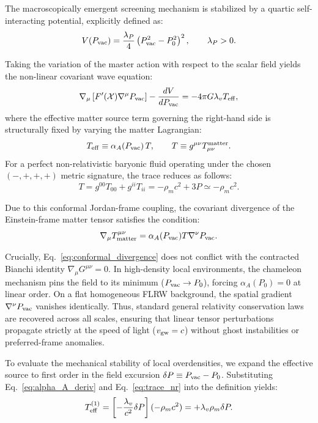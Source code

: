 \documentclass[prd,
               reprint,
               aps,
               preprintnumbers,
               nofootinbib,
               longbibliography,
               floatfix]{revtex4-2}
\begin{document}
The macroscopically emergent screening mechanism is stabilized by a
quartic self-interacting potential, explicitly defined as:
\begin{equation}
\label{eq:Vquartic}
V(P_{\rm vac})=\frac{\lambda_P}{4}\left(P_{\rm vac}^2-P_0^2\right)^2,
\qquad \lambda_P>0.
\end{equation}

Taking the variation of the master action with respect to the scalar
field yields the non-linear covariant wave equation:
\begin{equation}
\label{eq:box_pvac}
\nabla_\mu \left[ F'(\mathcal{X}) \nabla^\mu P_{\rm vac} \right]
-\frac{dV}{dP_{\rm vac}} = -4\pi G\lambda_v T_{\rm eff},
\end{equation}
where the effective matter source term governing the right-hand side 
is structurally fixed by varying the matter Lagrangian:
\begin{equation}
\label{eq:Teff_def}
T_{\rm eff} \equiv \alpha_A(P_{\rm vac})\,T, \qquad T \equiv
g^{\mu\nu}T_{\mu\nu}^{\rm matter}.
\end{equation}
For a perfect non-relativistic baryonic fluid operating under the chosen
$(-,+,+,+)$ metric signature, the trace reduces as follows:
\begin{equation}
\label{eq:trace_nr}
T = g^{00}T_{00} + g^{ii}T_{ii} = -\rho_m c^2 + 3P \simeq -\rho_m c^2.
\end{equation}

Due to this conformal Jordan-frame coupling, the covariant divergence
of the Einstein-frame matter tensor satisfies the condition:
\begin{equation}
\label{eq:conformal_divergence}
\nabla_\mu T^{\mu\nu}_{\rm matter} =
\alpha_A(P_{\rm vac}) T \nabla^\nu P_{\rm vac}.
\end{equation}

Crucially, Eq.~\eqref{eq:conformal_divergence} does not conflict with
the contracted Bianchi identity $\nabla_\mu G^{\mu\nu} = 0$. In
high-density local environments, the chameleon mechanism pins the
field to its minimum ($P_{\rm vac} \to P_0$), forcing $\alpha_A(P_0) =
0$ at linear order. On a flat homogeneous FLRW background, the spatial
gradient $\nabla^\nu P_{\rm vac}$ vanishes identically. Thus, standard
general relativity conservation laws are recovered across all scales,
ensuring that linear tensor perturbations propagate strictly at the
speed of light ($v_{\rm gw} = c$) without ghost instabilities or
preferred-frame anomalies.

To evaluate the mechanical stability of local overdensities, we expand
the effective source to first order in the field excursion
$\delta P \equiv P_{\rm vac}-P_0$. Substituting Eq.~\eqref{eq:alpha_A_deriv}
and Eq.~\eqref{eq:trace_nr} into the definition yields:
\begin{equation}
\label{eq:Teff_linear}
T_{\rm eff}^{(1)} = \left[-\frac{\lambda_v}{c^2}\delta P\right] 
(-\rho_m c^2) = +\lambda_v \rho_m \delta P.
\end{equation}
\end{document}
